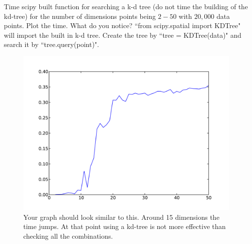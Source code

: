 \begin{problem}
Time scipy built function for searching a k-d tree (do not time the building of the kd-tree) for the number of dimensions points being $2-50$ with $20,000$ data points.
Plot the time.
What do you notice?
``from scipy.spatial import KDTree" will import the built in k-d tree.
Create the tree by ``tree = KDTree(data)" and search it by ``tree.query(point)".

\end{problem}
\begin{figure}[h!]
\includegraphics[scale = .5]{curseD.pdf}
\caption{
Your graph should look similar to this.
Around 15 dimensions the time jumps.
At that point using a kd-tree is not more effective than checking all the combinations.}
\end{figure}


